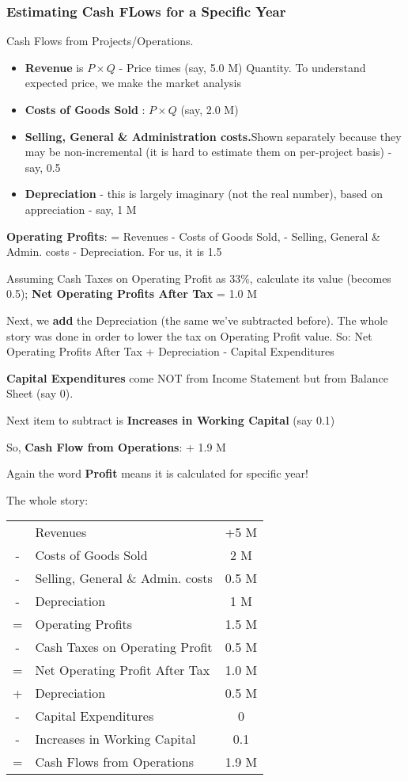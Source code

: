 \documentclass{scrartcl}
\begin{document}
\subsubsection{Estimating Cash FLows for a Specific Year}

Cash Flows from Projects/Operations. 
\begin{itemize}
\item {\bf Revenue} is $P \times Q$ - Price times (say, 5.0 M)
Quantity. To understand expected price, we make the market analysis 
\item {\bf Costs of Goods Sold} : $P \times Q$ (say, 2.0 M)
\item {\bf Selling, General \& Administration costs.}Shown separately because
  they may be non-incremental (it is hard to estimate them on per-project
  basis) - say, 0.5 
\item {\bf Depreciation} - this is largely imaginary (not the real number),
  based on appreciation - say, 1 M
\end{itemize}

{\bf Operating Profits}: = Revenues - Costs of Goods Sold, - Selling, General \&
Admin. costs - Depreciation. For us, it is 1.5

Assuming Cash Taxes on Operating Profit as 33\%, calculate its value (becomes
0.5);  {\bf Net Operating Profits After Tax} = 1.0 M

Next, we {\bf add} the Depreciation (the same we've subtracted before). The
whole story was done in order to lower the tax on Operating Profit value. So:
Net Operating Profits After Tax + Depreciation - Capital Expenditures

{\bf Capital Expenditures} come NOT from Income Statement but from Balance
Sheet (say 0).

Next item to subtract is {\bf Increases in Working Capital} (say 0.1)

So, {\bf Cash Flow from Operations}: + 1.9 M

Again the word {\bf Profit} means it is calculated for specific year!

The whole story:

\begin{tabular}{cl|c}
\hline
 & Revenues & +5 M \\
- & Costs of Goods Sold & 2 M \\
- & Selling, General \& Admin. costs & 0.5 M \\
- & Depreciation & 1 M\\
  \hline
= & Operating Profits &  1.5 M \\
- & Cash Taxes on Operating Profit & 0.5 M \\
\hline
= & Net Operating Profit After Tax & 1.0 M \\
+ & Depreciation & 0.5 M \\
- & Capital Expenditures & 0 \\
- & Increases in Working Capital & 0.1 \\
\hline
= & Cash Flows from Operations & 1.9 M \\
\end{tabular}
\end{document}
